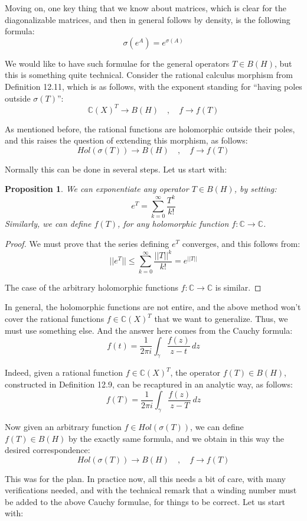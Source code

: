 \documentclass[12pt]{amsbook}
\newtheorem{proposition}[theorem]{Proposition}
\begin{document}
Moving on, one key thing that we know about matrices, which is clear for the diagonalizable matrices, and then in general follows by density, is the following formula:
$$\sigma(e^A)=e^{\sigma(A)}$$

We would like to have such formulae for the general operators $T\in B(H)$, but this is something quite technical. Consider the rational calculus morphism from Definition 12.11, which is as follows, with the exponent standing for ``having poles outside $\sigma(T)$'':
$$\mathbb C(X)^T\to B(H)\quad,\quad 
f\to f(T)$$

As mentioned before, the rational functions are holomorphic outside their poles, and this raises the question of extending this morphism, as follows:
$$Hol(\sigma(T))\to B(H)\quad,\quad
f\to f(T)$$

Normally this can be done in several steps. Let us start with:

\begin{proposition}
We can exponentiate any operator $T\in B(H)$, by setting:
$$e^T=\sum_{k=0}^\infty\frac{T^k}{k!}$$ 
Similarly, we can define $f(T)$, for any holomorphic function $f:\mathbb C\to\mathbb C$.
\end{proposition}

\begin{proof}
We must prove that the series defining $e^T$ converges, and this follows from:
$$||e^T||
\leq\sum_{k=0}^\infty\frac{||T||^k}{k!}
=e^{||T||}$$

The case of the arbitrary holomorphic functions $f:\mathbb C\to\mathbb C$ is similar.
\end{proof}

In general, the holomorphic functions are not entire, and the above method won't cover the rational functions $f\in\mathbb C(X)^T$ that we want to generalize. Thus, we must use something else. And the answer here comes from the Cauchy formula:
$$f(t)=\frac{1}{2\pi i}\int_\gamma\frac{f(z)}{z-t}\,dz$$

Indeed, given a rational function $f\in\mathbb C(X)^T$, the operator $f(T)\in B(H)$, constructed in Definition 12.9, can be recaptured in an analytic way, as follows:
$$f(T)=\frac{1}{2\pi i}\int_\gamma\frac{f(z)}{z-T}\,dz$$

Now given an arbitrary function $f\in Hol(\sigma(T))$, we can define $f(T)\in B(H)$ by the exactly same formula, and we obtain in this way the desired correspondence:
$$Hol(\sigma(T))\to B(H)\quad,\quad 
f\to f(T)$$

This was for the plan. In practice now, all this needs a bit of care, with many verifications needed, and with the technical remark that a winding number must be added to the above Cauchy formulae, for things to be correct. Let us start with:
\end{document}
